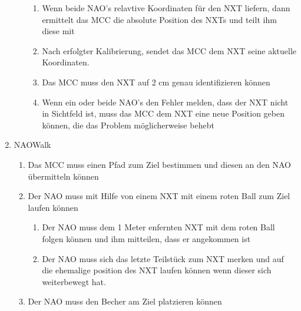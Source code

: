 \begin{enumerate}
\begin{enumerate}
\begin{enumerate}
            \item Wenn beide NAO's relavtive Koordinaten für den NXT liefern, dann ermittelt das MCC die absolute Position des NXTs und teilt ihm diese mit

            \item Nach erfolgter Kalibrierung, sendet das MCC dem NXT seine aktuelle Koordinaten.

            \item Das MCC muss den NXT auf 2 cm genau identifizieren können
            
            \item Wenn ein oder beide NAO's den Fehler melden, dass der NXT nicht in Sichtfeld ist, muss das MCC dem NXT eine neue Position geben können, die das Problem möglicherweise behebt
        \end{enumerate}
    \end{enumerate}
    \item NAOWalk
    \begin{enumerate}
        \item Das MCC muss einen Pfad zum Ziel bestimmen und diesen an den NAO übermitteln können

        \item Der NAO muss mit Hilfe von einem NXT mit einem roten Ball zum Ziel laufen können
        \begin{enumerate}
            \item Der NAO muss dem 1 Meter enfernten NXT mit dem roten Ball folgen können und ihm mitteilen, dass er angekommen ist

            \item Der NAO muss sich das letzte Teilstück zum NXT merken und auf die ehemalige position des NXT laufen können wenn dieser sich weiterbewegt hat.
        \end{enumerate}
        \item Der NAO muss den Becher am Ziel platzieren können
    \end{enumerate}
\end{enumerate}
    
